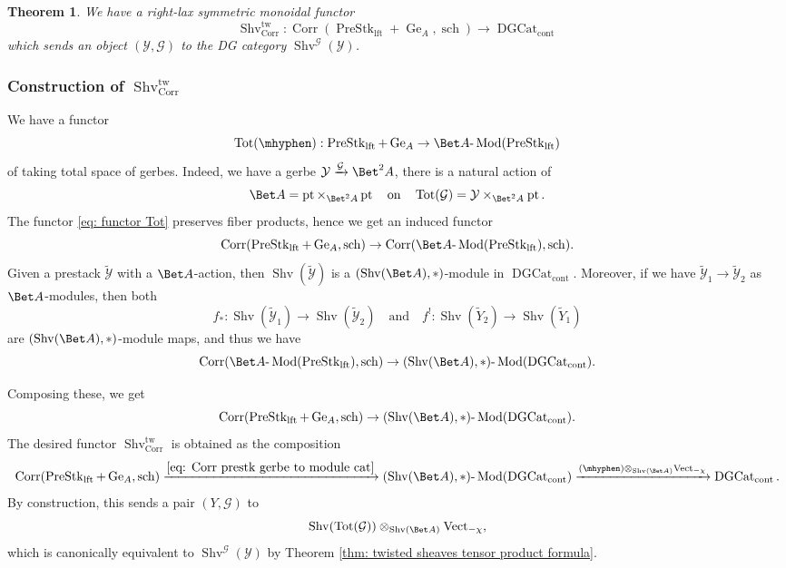 \documentclass[10pt]{amsart}
\newcommand{\sssec}{\subsubsection}
\newtheorem{thm}[subsubsection]{Theorem}
\theoremstyle{remark}
\newcommand{\te}{\text}
\newcommand{\wt}{\widetilde}
\newcommand{\on}{\operatorname}
\newcommand{\cG}{\mathcal{G}}
\newcommand{\cY}{\mathcal{Y}}
\newcommand{\DGcat}{\on{DGCat}_{\on{cont}}}
\newcommand{\lMod}{\text{-}\on{Mod}}
\newcommand{\Vect}{\on{Vect}}
\newcommand{\Shv}{\on{Shv}}
\newcommand{\PreStklft}{\on{PreStk}_{\on{lft}}}
\newcommand{\pt}{\on{pt}}
\newcommand{\Corr}{\on{Corr}}
\begin{document}
\begin{thm}\label{thm: twShvCorr functor}
    We have a right-lax symmetric monoidal functor
    \begin{equation}\label{eq: twisted shv Corr case 1}
       \Shv^{\on{tw}}_{\on{Corr}}:\on{Corr}\left(\PreStklft+\on{Ge}_A, \on{sch}\right)\rightarrow \DGcat 
    \end{equation}
    which sends an object $(\cY,\cG)$ to the DG category $\Shv^{\cG}(\cY)$.
\end{thm}

\sssec{Construction of $\Shv^{\on{tw}}_{\Corr}$}
We have a functor
\begin{equation}\label{eq: functor Tot}
    \on{Tot}(\mhyphen):\PreStklft+\on{Ge}_A\rightarrow \Bet A\lMod (\PreStklft)
\end{equation}
of taking total space of gerbes. Indeed, we have a gerbe $\cY\xrightarrow{\cG}\Bet^2 A$, there is a natural action of
\[\Bet A=\pt\times_{\Bet^2 A} \pt \quad \te{on} \quad \on{Tot}(\cG)= \cY\times_{\Bet^2 A}\pt.\]
The functor \eqref{eq: functor Tot} preserves fiber products, hence we get an induced functor
\[\on{Corr}(\PreStklft+\on{Ge}_A,\on{sch})\rightarrow \on{Corr}(\Bet A\lMod(\PreStklft),\on{sch}).\]
Given a prestack $\wt{\cY}$ with a $\Bet A$-action, then $\Shv(\wt{\cY})$ is a $(\Shv(\Bet A),\ast)$-module in $\DGcat$. Moreover, if we have $\wt{\cY}_1\rightarrow \wt{\cY}_2$ as $\Bet A$-modules, then both
\[f_*: \Shv(\wt{\cY}_1)\rightarrow \Shv(\wt{\cY}_2)\quad \te{and}\quad f^!:\Shv(\wt{Y}_2)\rightarrow \Shv(\wt{Y}_1)\]
are $(\Shv(\Bet A),\ast)$-module maps, and thus we have
\begin{equation}\label{eq: Corr BA mod to Shv BA mod}
    \on{Corr}(\Bet A\lMod(\PreStklft),\on{sch})\rightarrow (\Shv(\Bet A),\ast)\lMod(\DGcat).
\end{equation}

Composing these, we get
\begin{equation}\label{eq: Corr prestk gerbe to module cat}
    \on{Corr}(\PreStklft+\on{Ge}_A, \on{sch})\rightarrow (\Shv(\Bet A),\ast)\lMod(\DGcat).
\end{equation}
The desired functor $\Shv^{\on{tw}}_{\Corr}$ is obtained as the composition
\[ \on{Corr}(\PreStklft+\on{Ge}_A, \on{sch})\xrightarrow{\eqref{eq: Corr prestk gerbe to module cat}} (\Shv(\Bet A),\ast)\lMod(\DGcat)\xrightarrow{(\mhyphen)\otimes_{\Shv(\Bet A)}\Vect_{-\chi}} \DGcat.\]
By construction, this sends a pair $(Y,\cG)$ to
\[\Shv(\on{Tot}(\cG))\otimes_{\Shv(\Bet A)}\Vect_{-\chi},\]
which is canonically equivalent to $\Shv^{\cG}(\cY)$ by Theorem \ref{thm: twisted sheaves tensor product formula}.
\end{document}
